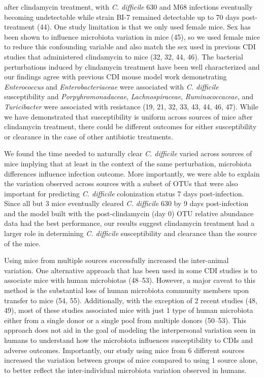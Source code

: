 \documentclass[
  11pt,
]{article}
\begin{document}
after clindamycin treatment, with \emph{C. difficile} 630 and M68
infections eventually becoming undetectable while strain BI-7 remained
detectable up to 70 days post-treatment (44). One study limitation is
that we only used female mice. Sex has been shown to influence
microbiota variation in mice (45), so we used female mice to reduce this
confounding variable and also match the sex used in previous CDI studies
that administered clindamycin to mice (32, 32, 44, 46). The bacterial
perturbations induced by clindamycin treatment have been well
characterized and our findings agree with previous CDI mouse model work
demonstrating \emph{Enterococcus} and \emph{Enterobacteriaceae} were
associated with \emph{C. difficile} susceptibility and
\emph{Porpyhromonadaceae}, \emph{Lachnospiraceae},
\emph{Ruminococcaceae}, and \emph{Turicibacter} were associated with
resistance (19, 21, 32, 33, 43, 44, 46, 47). While we have demonstrated
that susceptibility is uniform across sources of mice after clindamycin
treatment, there could be different outcomes for either susceptibility
or clearance in the case of other antibiotic treatments.

We found the time needed to naturally clear \emph{C. difficile} varied
across sources of mice implying that at least in the context of the same
perturbation, microbiota differences influence infection outcome. More
importantly, we were able to explain the variation observed across
sources with a subset of OTUs that were also important for predicting
\emph{C. difficile} colonization status 7 days post-infection. Since all
but 3 mice eventually cleared \emph{C. difficile} 630 by 9 days
post-infection and the model built with the post-clindamycin (day 0) OTU
relative abundance data had the best performance, our results suggest
clindamycin treatment had a larger role in determining \emph{C.
difficile} susceptibility and clearance than the source of the mice.

Using mice from multiple sources successfully increased the inter-animal
variation. One alternative approach that has been used in some CDI
studies is to associate mice with human microbiotas (48--53). However, a
major caveat to this method is the substantial loss of human microbiota
community members upon transfer to mice (54, 55). Additionally, with the
exception of 2 recent studies (48, 49), most of these studies associated
mice with just 1 type of human microbiota either from a single donor or
a single pool from multiple donors (50--53). This approach does not aid
in the goal of modeling the interpersonal variation seen in humans to
understand how the microbiota influences susceptibility to CDIs and
adverse outcomes. Importantly, our study using mice from 6 different
sources increased the variation between groups of mice compared to using
1 source alone, to better reflect the inter-individual microbiota
variation observed in humans.
\end{document}
